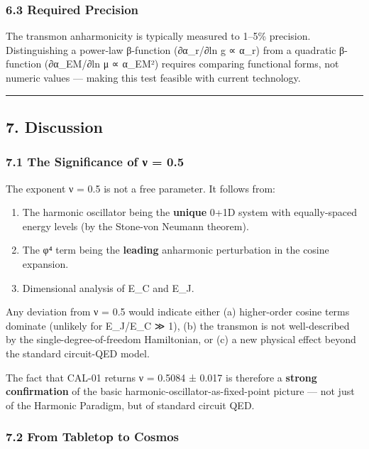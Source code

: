 \documentclass[
]{article}
\providecommand{\tightlist}{%
  \setlength{\itemsep}{0pt}\setlength{\parskip}{0pt}}
\begin{document}
\subsubsection{6.3 Required Precision}\label{required-precision}

The transmon anharmonicity is typically measured to 1--5\% precision.
Distinguishing a power-law β-function (∂α\_r/∂ln g ∝ α\_r) from a
quadratic β-function (∂α\_EM/∂ln μ ∝ α\_EM²) requires comparing
functional forms, not numeric values --- making this test feasible with
current technology.

\begin{center}\rule{0.5\linewidth}{0.5pt}\end{center}

\subsection{7. Discussion}\label{discussion}

\subsubsection{7.1 The Significance of ν =
0.5}\label{the-significance-of-ux3bd-0.5}

The exponent ν = 0.5 is not a free parameter. It follows from:

\begin{enumerate}
\def\labelenumi{\arabic{enumi}.}
\tightlist
\item
  The harmonic oscillator being the \textbf{unique} 0+1D system with
  equally-spaced energy levels (by the Stone-von Neumann theorem).
\item
  The φ⁴ term being the \textbf{leading} anharmonic perturbation in the
  cosine expansion.
\item
  Dimensional analysis of E\_C and E\_J.
\end{enumerate}

Any deviation from ν = 0.5 would indicate either (a) higher-order cosine
terms dominate (unlikely for E\_J/E\_C ≫ 1), (b) the transmon is not
well-described by the single-degree-of-freedom Hamiltonian, or (c) a new
physical effect beyond the standard circuit-QED model.

The fact that CAL-01 returns ν = 0.5084 ± 0.017 is therefore a
\textbf{strong confirmation} of the basic
harmonic-oscillator-as-fixed-point picture --- not just of the Harmonic
Paradigm, but of standard circuit QED.

\subsubsection{7.2 From Tabletop to
Cosmos}\label{from-tabletop-to-cosmos}
\end{document}
